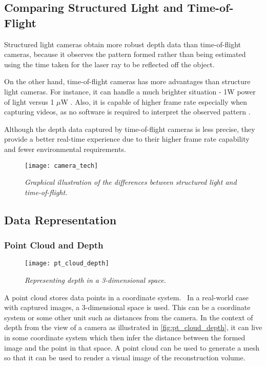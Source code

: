 \subsection{Comparing Structured Light and Time-of-Flight}
Structured light cameras obtain more robust depth data than time-of-flight cameras, because it observes the pattern formed rather than being estimated using the time taken for the laser ray to be reflected off the object. 

On the other hand, time-of-flight cameras has more advantages than structure light cameras. For instance, it can handle a much brighter situation - 1W power of light versus 1 $\mu$W \cite{kinect-version-compare}. Also, it is capable of higher frame rate especially when capturing videos, as no software is required to interpret the observed pattern \cite{kinect-cam-tech}.

Although the depth data captured by time-of-flight cameras is less precise, they provide a better real-time experience due to their higher frame rate capability and fewer environmental requirements. 
\\

\begin{figure}[h]
  \centering
  \texttt{[image: camera\_tech]}
  \caption{\textit{Graphical illustration of the differences between structured light and time-of-flight.}}
  \label{fig:camera_tech}
\end{figure}


\newpage
\subsection{Data Representation} \label{ssec:lit-data_rep}
\subsubsection{Point Cloud and Depth}

\begin{figure}[ht]
  \centering
  \texttt{[image: pt\_cloud\_depth]}
  \caption{\textit{Representing depth in a 3-dimensional space.}}
  \label{fig:pt_cloud_depth}
\end{figure}

A point cloud stores data points in a coordinate system.~\cite{chi-book} In a real-world case with captured images, a 3-dimensional space is used. This can be a coordinate system or some other unit such as distances from the camera. In the context of depth from the view of a camera as illustrated in \autoref{fig:pt_cloud_depth}, it can live in some coordinate system which then infer the distance between the formed image and the point in that space. A point cloud can be used to generate a mesh so that it can be used to render a visual image of the reconstruction volume.

